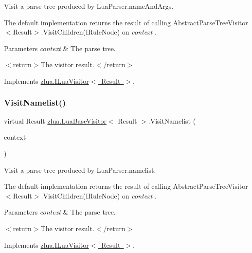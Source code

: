 Visit a parse tree produced by Lua\+Parser.\+name\+And\+Args. 

The default implementation returns the result of calling Abstract\+Parse\+Tree\+Visitor$<$\+Result$>$.\+Visit\+Children(\+I\+Rule\+Node) on {\itshape context} . 


\begin{DoxyParams}{Parameters}
{\em context} & The parse tree.\\
\hline
\end{DoxyParams}
$<$return$>$The visitor result.$<$/return$>$ 

Implements \mbox{\hyperlink{interfacezlua_1_1_i_lua_visitor_ac5b8231ca7341838cf864725ea880083}{zlua.\+I\+Lua\+Visitor$<$ Result $>$}}.

\mbox{\label{classzlua_1_1_lua_base_visitor_ac7d5334db78b99d1733e979269f5ad9a}} 
\subsubsection{\texorpdfstring{Visit\+Namelist()}{VisitNamelist()}}
{\footnotesize\ttfamily virtual Result \mbox{\hyperlink{classzlua_1_1_lua_base_visitor}{zlua.\+Lua\+Base\+Visitor}}$<$ Result $>$.Visit\+Namelist (\begin{DoxyParamCaption}\item[{\mbox{[}\+Not\+Null\mbox{]} \mbox{\hyperlink{classzlua_1_1_lua_parser_1_1_namelist_context}{Lua\+Parser.\+Namelist\+Context}}}]{context }\end{DoxyParamCaption})\hspace{0.3cm}{\ttfamily [virtual]}}



Visit a parse tree produced by Lua\+Parser.\+namelist. 

The default implementation returns the result of calling Abstract\+Parse\+Tree\+Visitor$<$\+Result$>$.\+Visit\+Children(\+I\+Rule\+Node) on {\itshape context} . 


\begin{DoxyParams}{Parameters}
{\em context} & The parse tree.\\
\hline
\end{DoxyParams}
$<$return$>$The visitor result.$<$/return$>$ 

Implements \mbox{\hyperlink{interfacezlua_1_1_i_lua_visitor_a6e378a829595016d1d812a7d0b7c9048}{zlua.\+I\+Lua\+Visitor$<$ Result $>$}}.

